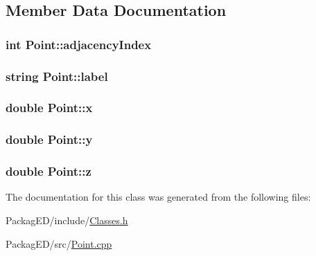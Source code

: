 \subsection{Member Data Documentation}
\subsubsection[{\texorpdfstring{adjacency\+Index}{adjacencyIndex}}]{\setlength{\rightskip}{0pt plus 5cm}int Point\+::adjacency\+Index}\hypertarget{class_point_a6995d9f9ed71b43b711347a3483eb3b9}{}\label{class_point_a6995d9f9ed71b43b711347a3483eb3b9}
\subsubsection[{\texorpdfstring{label}{label}}]{\setlength{\rightskip}{0pt plus 5cm}string Point\+::label}\hypertarget{class_point_a1e929419353f9bec46732af977adb55a}{}\label{class_point_a1e929419353f9bec46732af977adb55a}
\subsubsection[{\texorpdfstring{x}{x}}]{\setlength{\rightskip}{0pt plus 5cm}double Point\+::x}\hypertarget{class_point_ab99c56589bc8ad5fa5071387110a5bc7}{}\label{class_point_ab99c56589bc8ad5fa5071387110a5bc7}
\subsubsection[{\texorpdfstring{y}{y}}]{\setlength{\rightskip}{0pt plus 5cm}double Point\+::y}\hypertarget{class_point_afa38be143ae800e6ad69ce8ed4df62d8}{}\label{class_point_afa38be143ae800e6ad69ce8ed4df62d8}
\subsubsection[{\texorpdfstring{z}{z}}]{\setlength{\rightskip}{0pt plus 5cm}double Point\+::z}\hypertarget{class_point_a05ba3b1dfcb19430582ae953cbbfbded}{}\label{class_point_a05ba3b1dfcb19430582ae953cbbfbded}


The documentation for this class was generated from the following files\+:\begin{DoxyCompactItemize}
\item 
Packag\+E\+D/include/\hyperlink{_classes_8h}{Classes.\+h}\item 
Packag\+E\+D/src/\hyperlink{_point_8cpp}{Point.\+cpp}\end{DoxyCompactItemize}
